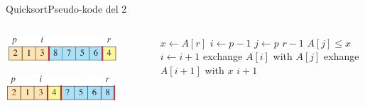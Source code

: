 \documentclass[aspectratio=1610]{beamer}
\begin{document}
\begin{frame}{Quicksort}{Pseudo-kode del 2}
\begin{columns}
\begin{overprint}
            \centerline{\includegraphics[width=0.8\textwidth]{quicksort/example-h}}
            \centerline{\includegraphics[width=0.8\textwidth]{quicksort/example-i}}
        \end{overprint}


        \begin{minipage}{\textwidth}
            \centering
            \begin{tcolorbox}

                \vspace{-\abovedisplayskip}
                \begin{codebox}
                    \li $x \gets A[r]$
                    \li $i \gets p-1$
                    \li \For $j \gets p$ \To $r-1$
                        \Do
                    \li     \If $A[j] \leq x$ \Then
                    \li         $i \gets i + 1$
                    \li         exchange $A[i]$ with $A[j]$
                            \End
                        \End
                    \li exhange $A[i+1]$ with $x$
                    \li \Return $i+1$
                \end{codebox}
            \end{tcolorbox}
        \end{minipage}
        
    \end{columns}
\end{frame}
\end{document}
